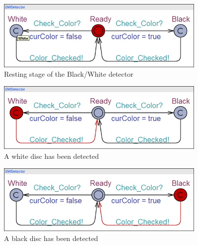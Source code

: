 \documentclass[a4paper,oneside,11pt]{report}
\begin{document}
\begin{figure}
\centering
\includegraphics[width=0.9\textwidth]{images/bwd1.jpg}
\caption{Resting stage of the Black/White detector}
\label{fig:bwd1}
\end{figure}

\begin{figure}
\centering
\includegraphics[width=0.9\textwidth]{images/bwd2.jpg}
\caption{A white disc has been detected}
\label{fig:bwd2}
\end{figure}

\begin{figure}
\centering
\includegraphics[width=0.9\textwidth]{images/bwd3.jpg}
\caption{A black disc has been detected}
\label{fig:bwd3}
\end{figure}
\end{document}
